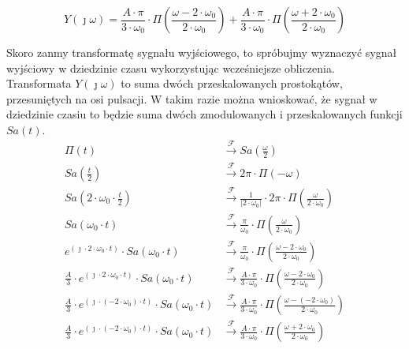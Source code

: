 \begin{task}
\begin{figure}[H]
\end{figure}

\begin{equation}
Y(\jmath \omega) = \frac{A \cdot \pi}{3 \cdot \omega_0} \cdot \Pi \left(\frac{\omega - 2 \cdot \omega_0}{2 \cdot \omega_0}\right) +  \frac{A \cdot \pi}{3 \cdot \omega_0} \cdot \Pi \left(\frac{\omega + 2 \cdot \omega_0}{2 \cdot \omega_0}\right)
\end{equation}

Skoro zanmy transformatę sygnału wyjściowego, to spróbujmy wyznaczyć sygnał wyjściowy w dziedzinie czasu wykorzystując wcześniejsze obliczenia. Transformata $Y(\jmath \omega)$ to suma dwóch przeskalowanych prostokątów, przesuniętych na osi pulsacji. W takim razie można wnioskować, że sygnał w dziedzinie czasiu to będzie suma dwóch zmodulowanych i przeskalowanych funkcji $Sa(t)$. 
\begin{align*}
\Pi(t) &\xrightarrow{\mathcal F} Sa\left(\frac{\omega}{2}\right)\\
Sa\left(\frac{t}{2}\right)&\xrightarrow{\mathcal F} 2 \pi \cdot \Pi(-\omega)\\
Sa\left(2 \cdot \omega_0 \cdot \frac{t}{2}\right)&\xrightarrow{\mathcal F} \frac{1}{\left|2 \cdot \omega_0\right|} \cdot 2 \pi \cdot \Pi \left(\frac{\omega}{2 \cdot \omega_0}\right)\\
Sa(\omega_0 \cdot t)&\xrightarrow{\mathcal F} \frac{\pi}{\omega_0}\cdot \Pi \left(\frac{\omega}{2 \cdot \omega_0}\right)\\
e^{(\jmath \cdot 2 \cdot \omega_0 \cdot t)} \cdot Sa(\omega_0 \cdot t)&\xrightarrow{\mathcal F} \frac{\pi}{\omega_0}\cdot \Pi \left(\frac{\omega - 2 \cdot \omega_0}{2 \cdot \omega_0}\right)\\
\frac{A}{3} \cdot e^{(\jmath \cdot 2 \cdot \omega_0 \cdot t)} \cdot Sa(\omega_0 \cdot t)&\xrightarrow{\mathcal F} \frac{A \cdot \pi}{3 \cdot \omega_0}\cdot \Pi \left(\frac{\omega - 2 \cdot \omega_0}{2 \cdot \omega_0}\right)\\
\frac{A}{3} \cdot e^{(\jmath \cdot (-2 \cdot \omega_0) \cdot t)} \cdot Sa(\omega_0 \cdot t)&\xrightarrow{\mathcal F} \frac{A \cdot \pi}{3 \cdot \omega_0}\cdot \Pi \left(\frac{\omega - (-2 \cdot \omega_0)}{2 \cdot \omega_0}\right)\\
\frac{A}{3} \cdot e^{(\jmath \cdot (-2 \cdot \omega_0) \cdot t)} \cdot Sa(\omega_0 \cdot t)&\xrightarrow{\mathcal F} \frac{A \cdot \pi}{3 \cdot \omega_0}\cdot \Pi \left(\frac{\omega + 2 \cdot \omega_0}{2 \cdot \omega_0}\right)\\
\end{align*}


\end{task}
